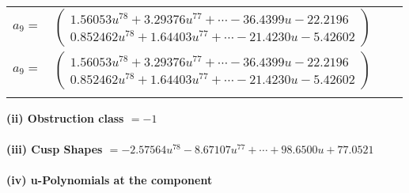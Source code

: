 \documentclass[1p]{elsarticle_modified}
\theoremstyle{definition}
\begin{document}
\begin{tabular}{m{7pt} m{180pt} m{7pt} m{180pt} }
\flushright $a_{9}=$&$\begin{pmatrix}1.56053 u^{78}+3.29376 u^{77}+\cdots-36.4399 u-22.2196\\0.852462 u^{78}+1.64403 u^{77}+\cdots-21.4230 u-5.42602\end{pmatrix}$\\ \flushright $a_{9}=$&$\begin{pmatrix}1.56053 u^{78}+3.29376 u^{77}+\cdots-36.4399 u-22.2196\\0.852462 u^{78}+1.64403 u^{77}+\cdots-21.4230 u-5.42602\end{pmatrix}$\\&\end{tabular}
\flushleft \textbf{(ii) Obstruction class $= -1$}\\~\\
\flushleft \textbf{(iii) Cusp Shapes $= -2.57564 u^{78}-8.67107 u^{77}+\cdots+98.6500 u+77.0521$}\\~\\
\newpage\renewcommand{\arraystretch}{1}
\flushleft \textbf{(iv) u-Polynomials at the component}\newline \\
\end{document}
